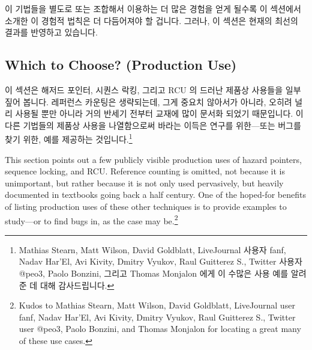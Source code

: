 이 기법들을 별도로 또는 조합해서 이용하는 더 많은 경험을 얻게 될수록 이
섹션에서 소개한 이 경험적 법칙은 더 다듬어져야 할 겁니다.
그러나, 이 섹션은 현재의 최선의 결과를 반영하고 있습니다.

\iffalse

Finally, the ``Lines of Code'' row shows the size of the Pre-BSD
Routing Table implementations, giving a rough idea of relative ease of use.
That said, it is important to note that the reference-counting and
sequence-locking implementations are buggy, and that a correct
reference-counting implementation is considerably
more complex~\cite{Valois95a,MagedMichael95a}.
For its part, a correct sequence-locking implementation requires
the addition of some other synchronization mechanism, for example,
hazard pointers or RCU, so that sequence locking detects concurrent
updates and the other mechanism provides safe reference acquisition.

As more experience is gained using these techniques, both separately
and in combination, the rules of thumb laid out in this section will
need to be refined.
However, this section does reflect the current state of the art.

\fi

\subsection{Which to Choose? (Production Use)}
\label{sec:defer:Which to Choose? (Production Use)}

이 섹션은 해저드 포인터, 시퀀스 락킹, 그리고 RCU 의 드러난 제품상 사용들을 일부
짚어 봅니다.
레퍼런스 카운팅은 생략되는데, 그게 중요치 않아서가 아니라, 오히려 널리 사용될
뿐만 아니라 거의 반세기 전부터 교재에 많이 문서화 되었기 때문입니다.
이 다른 기법들의 제품상 사용을 나열함으로써 바라는 이득은 연구를 위한---또는
버그를 찾기 위한, 예를 제공하는 것입니다.\footnote{
	Mathias Stearn, Matt Wilson, David Goldblatt, LiveJournal
	사용자 fanf, Nadav Har'El, Avi Kivity, Dmitry Vyukov, Raul Guitterez
	S., Twitter 사용자 @peo3, Paolo Bonzini, 그리고 Thomas Monjalon 에게 이
	수많은 사용 예를 알려준 데 대해 감사드립니다.}

\iffalse

This section points out a few publicly visible production uses of
hazard pointers, sequence locking, and RCU\@.
Reference counting is omitted, not because it is unimportant, but rather
because it is not only used pervasively, but heavily documented in textbooks
going back a half century.
One of the hoped-for benefits of listing production uses of these other
techniques is to provide examples to study---or to find bugs in, as
the case may be.\footnote{
	Kudos to Mathias Stearn, Matt Wilson, David Goldblatt, LiveJournal
	user fanf, Nadav Har'El, Avi Kivity, Dmitry Vyukov, Raul Guitterez
	S., Twitter user @peo3, Paolo Bonzini, and Thomas Monjalon for
	locating a great many of these use cases.}

